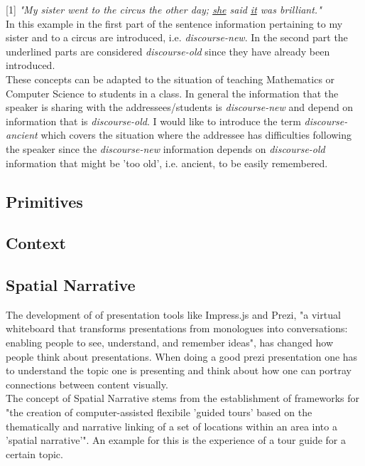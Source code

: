 \documentclass[twoside]{article}
\begin{document}
[1] \textit{"My sister went to the circus the other day; \underline{she} said \underline{it} was brilliant."}\\

In this example in the first part of the sentence information pertaining to my sister and to a circus are introduced, i.e. \textit{discourse-new}. In the second part the underlined parts are considered \textit{discourse-old} since they have already been introduced.\cite{Cambridge}\\

These concepts can be adapted to the situation of teaching Mathematics or Computer Science to students in a class. In general the information that the speaker is sharing with the addressees/students is \textit{discourse-new} and depend on  information that is \textit{discourse-old}. I would like to introduce the term \textit{discourse-ancient} which covers the situation where the addressee has difficulties following the speaker since the \textit{discourse-new} information depends on \textit{discourse-old} information that might be 'too old', i.e. ancient, to be easily remembered.\\

\subsection{Primitives}

\subsection{Context}


\subsection{Spatial Narrative}
The development of of presentation tools like Impress.js and Prezi, "a virtual whiteboard that transforms presentations from monologues into conversations: enabling people to see, understand, and remember ideas"\cite{Prezi}, has  changed how people think about presentations. When doing a good prezi presentation one has to understand the topic one is presenting and think about how one can portray connections between content visually.\\

The concept of Spatial Narrative stems from the establishment of frameworks for "the creation of computer-assisted flexibile 'guided tours' based on the thematically and narrative linking of a set of locations within an area into a 'spatial narrative'". An example for this is the experience of a tour guide for a certain topic.\cite{Narrative}\\
\end{document}
